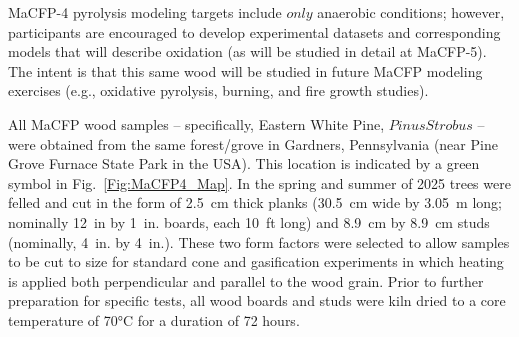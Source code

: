 \documentclass{book}
\begin{document}
MaCFP-4 pyrolysis modeling targets include $only$ anaerobic conditions; however, participants are encouraged to develop experimental datasets and corresponding models that will describe oxidation (as will be studied in detail at MaCFP-5). The intent is that this same wood will be studied in future MaCFP modeling exercises (e.g., oxidative pyrolysis, burning, and fire growth studies).

All MaCFP wood samples -- specifically, Eastern White Pine, $Pinus Strobus$ -- were obtained from the same forest/grove in Gardners, Pennsylvania (near Pine Grove Furnace State Park in the USA). This location is indicated by a green symbol in Fig.~\ref{Fig:MaCFP4_Map}. In the spring and summer of 2025 trees were felled and cut in the form of 2.5~cm thick planks (30.5~cm wide by 3.05~m long; nominally 12~in by 1~in. boards, each 10~ft long) and 8.9~cm by 8.9~cm studs (nominally, 4~in. by 4~in.). These two form factors were selected to allow samples to be cut to size for standard cone and gasification experiments in which heating is applied both perpendicular and parallel to the wood grain. Prior to further preparation for specific tests, all wood boards and studs were kiln dried to a core temperature of 70°C for a duration of 72 hours.
\end{document}
